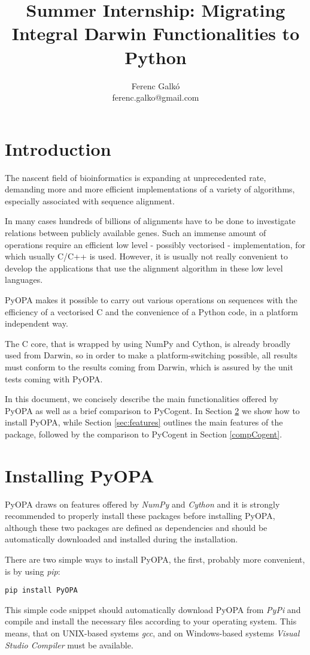 \documentclass[12pt]{article}
\title{Summer Internship: Migrating Integral Darwin Functionalities to Python}
\author{Ferenc Galk\'o  \\
    ferenc.galko@gmail.com}
\newcommand{\pp}{PyOPA}
\begin{document}
\maketitle
\newpage
\tableofcontents
\newpage
\section{Introduction}
The nascent field of bioinformatics is expanding at unprecedented rate, demanding more and more efficient implementations of a variety of algorithms, especially associated with sequence alignment.

In many cases hundreds of billions of alignments have to be done to investigate relations between publicly available genes. Such an immense amount of operations require an efficient low level - possibly vectorised - implementation, for which usually C/C++ is used. However, it is usually not really convenient to develop the applications that use the alignment algorithm in these low level languages.

\pp{} makes it possible to carry out various operations on sequences with the efficiency of a vectorised C and the convenience of a Python code, in a platform independent way. 

The C core, that is wrapped by using NumPy and Cython, is already broadly used from Darwin, so in order to make a platform-switching possible, all results must conform to the results coming from Darwin, which is assured by the unit tests coming with \pp{}.

In this document, we concisely describe the main functionalities offered by \pp{} as well as a brief comparison to PyCogent. In Section \ref{sec:inst} we show how to install \pp{}, while Section \ref{sec:features} outlines the main features of the package, followed by the comparison to PyCogent in Section \ref{compCogent}.

\section{Installing \pp{}}
\label{sec:inst}
\pp{} draws on features offered by \emph{NumPy} and \emph{Cython} and it is strongly recommended to properly install these packages before installing \pp{}, although these two packages are defined as dependencies and should be automatically downloaded and installed during the installation.

There are two simple ways to install \pp{}, the first, probably more convenient, is by using \emph{pip}:
\begin{lstlisting}
pip install PyOPA
\end{lstlisting}
This simple code snippet should automatically download \pp{} from \emph{PyPi} and compile and install the necessary files according to your operating system. This means, that on UNIX-based systems \emph{gcc}, and on Windows-based systems \emph{Visual Studio Compiler} must be available.
\end{document}
